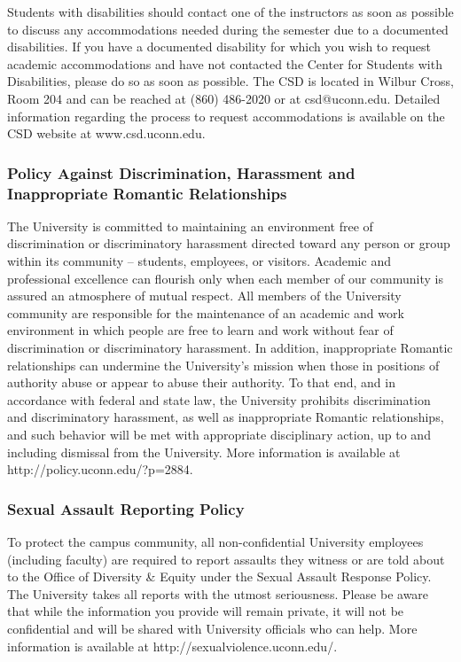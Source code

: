 \documentclass[
]{article}
\begin{document}
Students with disabilities should contact one of the instructors as soon
as possible to discuss any accommodations needed during the semester due
to a documented disabilities. If you have a documented disability for
which you wish to request academic accommodations and have not contacted
the Center for Students with Disabilities, please do so as soon as
possible. The CSD is located in Wilbur Cross, Room 204 and can be
reached at (860) 486-2020 or at csd@uconn.edu. Detailed information
regarding the process to request accommodations is available on the CSD
website at www.csd.uconn.edu.

\hypertarget{policy-against-discrimination-harassment-and-inappropriate-romantic-relationships}{%
\subsubsection{Policy Against Discrimination, Harassment and
Inappropriate Romantic
Relationships}\label{policy-against-discrimination-harassment-and-inappropriate-romantic-relationships}}

The University is committed to maintaining an environment free of
discrimination or discriminatory harassment directed toward any person
or group within its community -- students, employees, or visitors.
Academic and professional excellence can flourish only when each member
of our community is assured an atmosphere of mutual respect. All members
of the University community are responsible for the maintenance of an
academic and work environment in which people are free to learn and work
without fear of discrimination or discriminatory harassment. In
addition, inappropriate Romantic relationships can undermine the
University's mission when those in positions of authority abuse or
appear to abuse their authority. To that end, and in accordance with
federal and state law, the University prohibits discrimination and
discriminatory harassment, as well as inappropriate Romantic
relationships, and such behavior will be met with appropriate
disciplinary action, up to and including dismissal from the University.
More information is available at http://policy.uconn.edu/?p=2884.

\hypertarget{sexual-assault-reporting-policy}{%
\subsubsection{Sexual Assault Reporting
Policy}\label{sexual-assault-reporting-policy}}

To protect the campus community, all non-confidential University
employees (including faculty) are required to report assaults they
witness or are told about to the Office of Diversity \& Equity under the
Sexual Assault Response Policy. The University takes all reports with
the utmost seriousness. Please be aware that while the information you
provide will remain private, it will not be confidential and will be
shared with University officials who can help. More information is
available at http://sexualviolence.uconn.edu/.
\end{document}
